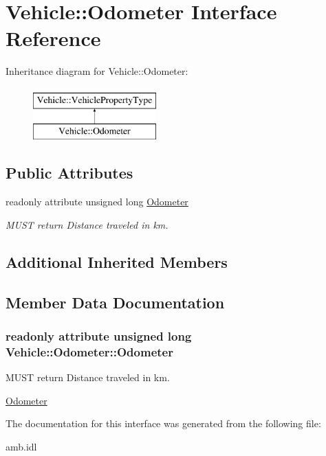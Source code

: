 \hypertarget{interfaceVehicle_1_1Odometer}{\section{Vehicle\-:\-:Odometer Interface Reference}
\label{interfaceVehicle_1_1Odometer}
}
Inheritance diagram for Vehicle\-:\-:Odometer\-:\begin{figure}[H]
\begin{center}
\leavevmode
\includegraphics[height=2.000000cm]{interfaceVehicle_1_1Odometer}
\end{center}
\end{figure}
\subsection*{Public Attributes}
\begin{DoxyCompactItemize}
\item 
readonly attribute unsigned long \hyperlink{interfaceVehicle_1_1Odometer_a6cc39a46e1dd1efbaa4d578470c3e7c6}{Odometer}
\begin{DoxyCompactList}\small\item\em M\-U\-S\-T return Distance traveled in km. \end{DoxyCompactList}\end{DoxyCompactItemize}
\subsection*{Additional Inherited Members}


\subsection{Member Data Documentation}
\hypertarget{interfaceVehicle_1_1Odometer_a6cc39a46e1dd1efbaa4d578470c3e7c6}{
\subsubsection[{Odometer}]{\setlength{\rightskip}{0pt plus 5cm}readonly attribute unsigned long Vehicle\-::\-Odometer\-::\-Odometer}}\label{interfaceVehicle_1_1Odometer_a6cc39a46e1dd1efbaa4d578470c3e7c6}


M\-U\-S\-T return Distance traveled in km. 

\hyperlink{interfaceVehicle_1_1Odometer}{Odometer} 

The documentation for this interface was generated from the following file\-:\begin{DoxyCompactItemize}
\item 
amb.\-idl\end{DoxyCompactItemize}
